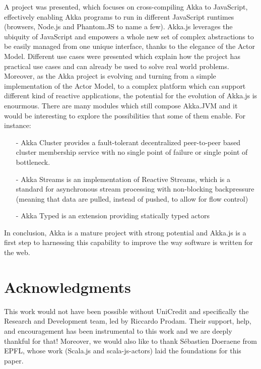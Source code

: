 \documentclass{sig-alternate}
\begin{document}
A project was presented, which focuses on cross-compiling Akka to JavaScript, effectively enabling Akka programs to run in different
JavaScript runtimes (browsers, Node.js and Phantom.JS to name a few).
Akka.js leverages the ubiquity of JavaScript and empowers a whole new set of complex abstractions to be easily managed from one
unique interface, thanks to the elegance of the Actor Model. Different use cases were presented which explain how the project
has practical use cases and can already be used to solve real world problems.
Moreover, as the Akka project is evolving and turning from a simple implementation of the Actor Model, to a complex platform
which can support different kind of reactive applications, the potential for the evolution of Akka.js is enourmous.
There are many modules which still compose Akka.JVM and it would be interesting to explore the possibilities that some of them
enable. For instance:
\begin{itemize}
\item[-] Akka Cluster provides a fault-tolerant decentralized peer-to-peer based cluster membership service with no single point of failure or single point of bottleneck.
\item[-] Akka Streams is an implementation of Reactive Streams, which is a standard for asynchronous stream processing with non-blocking backpressure (meaning that data
are pulled, instead of pushed, to allow for flow control)
\item[-] Akka Typed is an extension providing statically typed actors
\end{itemize}
In conclusion, Akka is a mature project with strong potential and Akka.js is a first step to harnessing this capability to
improve the way software is written for the web.


\section{Acknowledgments}

This work would not have been possible without UniCredit and specifically the Research and Development team, led by Riccardo Prodam. Their support, help, and encouragement has been instrumental to this work and we are deeply thankful for that!
Moreover, we would also like to thank S\'{e}bastien Doeraene from EPFL, whose work (Scala.js and scala-js-actors) laid the foundations for this paper.



%

%
%

\end{document}
